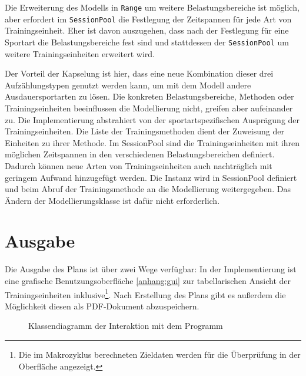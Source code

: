 Die Erweiterung des Modells in \texttt{Range} um weitere Belastungsbereiche ist möglich, aber erfordert im \texttt{SessionPool} die Festlegung der Zeitspannen für jede Art von Trainingseinheit. Eher ist davon auszugehen, dass nach der Festlegung für eine Sportart die Belastungsbereiche fest sind und stattdessen der \texttt{SessionPool} um weitere Trainingseinheiten erweitert wird. \par
Der Vorteil der Kapselung ist hier, dass eine neue Kombination dieser drei Aufzählungstypen genutzt werden kann, um mit dem Modell andere Ausdauersportarten zu lösen. Die konkreten Belastungsbereiche, Methoden oder Trainingseinheiten beeinflussen die Modellierung nicht, greifen aber aufeinander zu. Die Implementierung abstrahiert von der sportartspezifischen Ausprägung der Trainingseinheiten. Die Liste der Trainingsmethoden dient der Zuweisung der Einheiten zu ihrer Methode. Im SessionPool sind die Trainingseinheiten mit ihren möglichen Zeitspannen in den verschiedenen Belastungsbereichen definiert. Dadurch können neue Arten von Trainingseinheiten auch nachträglich mit geringem Aufwand hinzugefügt werden. Die Instanz wird in SessionPool definiert und beim Abruf der Trainingsmethode an die Modellierung weitergegeben. Das Ändern der Modellierungsklasse ist dafür nicht erforderlich.

\section{Ausgabe}
\label{sec:modellierung:output}
Die Ausgabe des Plans ist über zwei Wege verfügbar: In der Implementierung ist eine grafische Benutzungsoberfläche \ref{anhang:gui} zur tabellarischen Ansicht der Trainingseinheiten inklusive\footnote{Die im Makrozyklus berechneten Zieldaten werden für die Überprüfung in der Oberfläche angezeigt.}. Nach Erstellung des Plans gibt es außerdem die Möglichkeit diesen als PDF-Dokument abzuspeichern.

\begin{figure}[h]
\centering
    \caption{Klassendiagramm der Interaktion mit dem Programm}
    \label{fig:uml:solver}
\end{figure}

